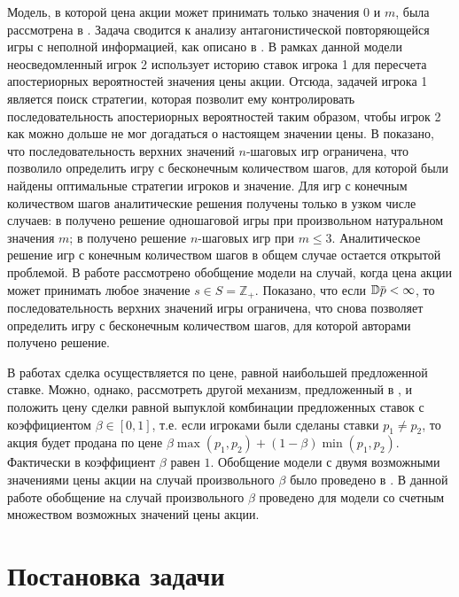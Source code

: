 \documentclass[12pt, draft]{extarticle}
\newcommand{\overbar}[1]%
{\mkern 1.5mu\overline{\mkern-1.3mu#1\mkern-1.3mu}\mkern 1.3mu}
\newcommand{\s}{\ensuremath{s}}
\newcommand{\p}{\ensuremath{\overbar{p}}}
\begin{document}
Модель, в которой цена акции может принимать только значения $0$ и $m$, была
рассмотрена в \cite{bib:domansky07}. Задача сводится к анализу антагонистической
повторяющейся игры с неполной информацией, как описано в \cite{bib:aumann}. В
рамках данной модели неосведомленный игрок 2 использует историю ставок игрока 1
для пересчета апостериорных вероятностей значения цены акции. Отсюда, задачей
игрока 1 является поиск стратегии, которая позволит ему контролировать
последовательность апостериорных вероятностей таким образом, чтобы игрок 2 как
можно дольше не мог догадаться о настоящем значении цены. В
\cite{bib:domansky07} показано, что последовательность верхних значений
$n$-шаговых игр ограничена, что позволило определить игру с бесконечным
количеством шагов, для которой были найдены оптимальные стратегии игроков и
значение.
%
Для игр с конечным количеством шагов аналитические решения получены только в
узком числе случаев: в \cite{bib:sandomirskaya12} получено решение одношаговой
игры при произвольном натуральном значения $m$; в \cite{bib:kreps09} получено
решение $n$-шаговых игр при $m \leqslant 3$. Аналитическое решение игр с
конечным количеством шагов в общем случае остается открытой проблемой.
%
В работе \cite{bib:domansky11} рассмотрено обобщение модели на случай, когда
цена акции может принимать любое значение $\s \in S = \mathbb{Z}_+$. Показано,
что если $\mathbb{D} \p < \infty$, то последовательность верхних значений игры
ограничена, что снова позволяет определить игру с бесконечным количеством шагов,
для которой авторами получено решение.

В работах \cite{bib:domansky07, bib:domansky11} сделка осуществляется по цене,
равной наибольшей предложенной ставке. Можно, однако, рассмотреть другой
механизм, предложенный в \cite{bib:chatterjee83}, и положить цену сделки равной
выпуклой комбинации предложенных ставок с коэффициентом $\beta \in [0,1]$, т.е.
если игроками были сделаны ставки $p_1 \neq p_2$, то акция будет продана по цене
$\beta \max(p_1, p_2) + (1-\beta) \min(p_1, p_2)$. Фактически в
\cite{bib:domansky07, bib:domansky11} коэффициент $\beta$ равен $1$. Обобщение
модели с двумя возможными значениями цены акции на случай произвольного $\beta$
было проведено в \cite{bib:pyanykh16}. В данной работе обобщение на случай
произвольного $\beta$ проведено для модели со счетным множеством возможных
значений цены акции.

\section{Постановка задачи}
\label{sec:problem-statement}
\end{document}
